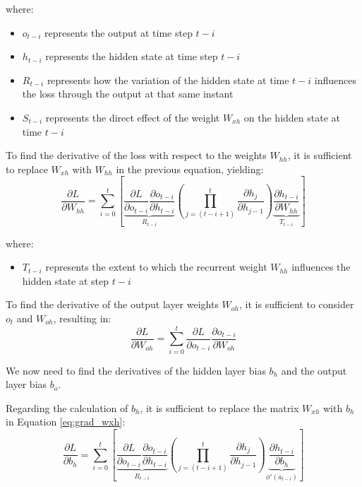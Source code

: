where:
\begin{itemize}
\item $o_{t-i}$ represents the output at time step $t-i$
\item $h_{t-i}$ represents the hidden state at time step $t-i$
\item $R_{t-i}$ represents how the variation of the hidden state at time $t-i$ influences the loss through the output at that same instant
\item $S_{t-i}$ represents the direct effect of the weight $W_{xh}$ on the hidden state at time $t-i$
\end{itemize}

To find the derivative of the loss with respect to the weights $W_{hh}$, it is sufficient to replace $W_{xh}$ with $W_{hh}$ in the previous equation, yielding:
\begin{equation}
\frac{\partial L}{\partial W_{hh}} = \sum_{i=0}^{t} \left[ \underbrace{\frac{\partial L}{\partial o_{t-i}} \frac{\partial o_{t-i}}{\partial h_{t-i}}}_{R_{t-i}} \left( \prod_{j=(t-i+1)}^{t} \frac{\partial h_j}{\partial h_{j-1}} \right) \underbrace{\frac{\partial h_{t-i}}{\partial W_{hh}}}_{T_{t-i}} \right]
\end{equation}

where:
\begin{itemize}
\item $T_{t-i}$ represents the extent to which the recurrent weight $W_{hh}$ influences the hidden state at step $t-i$
\end{itemize}

To find the derivative of the output layer weights $W_{oh}$, it is sufficient to consider $o_t$ and $W_{oh}$, resulting in:
\begin{equation}
\frac{\partial L}{\partial W_{oh}} = \sum_{i=0}^{t} \frac{\partial L}{\partial o_{t-i}} \frac{\partial o_{t-i}}{\partial W_{oh}}
\label{eq:grad_woh}
\end{equation}

We now need to find the derivatives of the hidden layer bias $b_h$ and the output layer bias $b_o$.

Regarding the calculation of $b_h$, it is sufficient to replace the matrix $W_{xh}$ with $b_h$ in Equation \ref{eq:grad_wxh}:
\begin{equation}
 \frac{\partial L}{\partial b_{h}} = \sum_{i=0}^{t} \left[ \underbrace{\frac{\partial L}{\partial o_{t-i}} \frac{\partial o_{t-i}}{\partial h_{t-i}}}_{R_{t-i}} \left( \prod_{j=(t-i+1)}^{t} \frac{\partial h_j}{\partial h_{j-1}} \right) \underbrace{\frac{\partial h_{t-i}}{\partial b_{h}}}_{\phi'(a_{t-i})} \right]
\end{equation}

